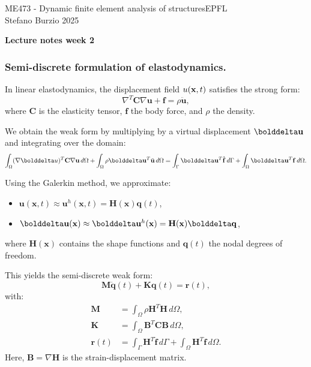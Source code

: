 \documentclass[12pt]{article}
\begin{document}
\noindent ME473 - Dynamic finite element analysis of structures\hfill EPFL\\
Stefano Burzio \hfill 2025\\
\vspace{0.3cm}

\hspace*{\fill}\textbf{\Large Lecture notes week 2}\hspace*{\fill}

\hrulefill


\subsubsection*{Semi-discrete formulation of elastodynamics.} In linear elastodynamics, the displacement field \( \mathbf  \mathbf u(\mathbf x, t) \) satisfies the strong form:
\[
    \nabla^T \mathbf C \nabla\mathbf  u + \mathbf f = \rho \ddot{\mathbf u},
\]
where \(\mathbf  C \) is the elasticity tensor, \( \mathbf f \) the body force, and \( \rho \) the density.

We obtain the weak form by multiplying by a virtual displacement \( \bolddelta \mathbf u \) and integrating over the domain:
\[
    \int_\Omega (\nabla \bolddelta u)^T \mathbf C \nabla \mathbf u \, d\Omega + \int_\Omega \rho \bolddelta \mathbf u^T \ddot{\mathbf u} \, d\Omega = \int_\Gamma \bolddelta \mathbf u^T \hat{\mathbf f} \, d\Gamma + \int_\Omega \bolddelta \mathbf u^T \mathbf f \, d\Omega.
\]

Using the Galerkin method, we approximate:
\begin{itemize}
    \item \(\mathbf u(\mathbf x,t) \approx\mathbf u^h(\mathbf x,t) =\mathbf H(\mathbf x) \mathbf q(t) \),
    \item \( \bolddelta\mathbf u(\mathbf x) \approx \bolddelta\mathbf u^h(\mathbf x) = \mathbf H(\mathbf x) \bolddelta \mathbf q \),
\end{itemize}
where \( \mathbf H(\mathbf x) \) contains the shape functions and \( \mathbf q(t) \) the nodal degrees of freedom.

This yields the semi-discrete weak form:
\[
    \mathbf M \ddot{\mathbf q}(t) + \mathbf K \mathbf q(t) = \mathbf r(t),
\]
with:
\begin{align*}
    \mathbf M    & = \int_\Omega \rho \mathbf H^T \mathbf H \, d\Omega,                                                 \\
    \mathbf K    & = \int_\Omega \mathbf B^T\mathbf C\mathbf B \, d\Omega,                                              \\
    \mathbf r(t) & = \int_\Gamma \mathbf H^T \hat{\mathbf f} \, d\Gamma + \int_\Omega \mathbf H^T \mathbf f \, d\Omega.
\end{align*}
Here, \( \mathbf B = \nabla\mathbf H \) is the strain-displacement matrix.
\end{document}
